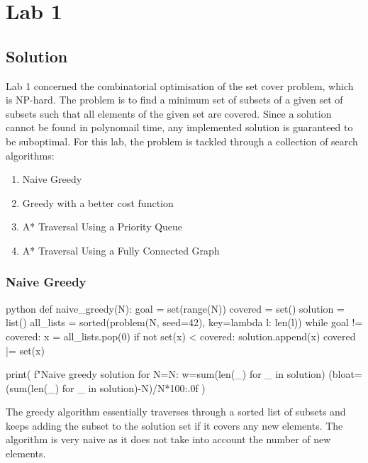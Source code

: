 
\section{Lab 1}

\subsection{Solution}

Lab 1 concerned the combinatorial optimisation of the set cover problem, which is NP-hard. The problem is to find a minimum set of subsets of a given set of subsets such that all elements of the given set are covered. Since a solution cannot be found in polynomail time, any implemented solution is guaranteed to be suboptimal. For this lab, the problem is tackled through a collection of search algorithms:

\begin{enumerate}
  \item Naive Greedy
  \item Greedy with a better cost function
  \item A* Traversal Using a Priority Queue
  \item A* Traversal Using a Fully Connected Graph
\end{enumerate}

\subsubsection{Naive Greedy}

\begin{mintedbox}{python}
  def naive_greedy(N):
    goal = set(range(N))
    covered = set()
    solution = list()
    all_lists = sorted(problem(N, seed=42), key=lambda l: len(l))
    while goal != covered:
        x = all_lists.pop(0)
        if not set(x) < covered:
            solution.append(x)
            covered |= set(x)

    print(
        f"Naive greedy solution for N={N}: w={sum(len(_) for _ in solution)} (bloat={(sum(len(_) for _ in solution)-N)/N*100:.0f}%
    )
\end{mintedbox}

The greedy algorithm essentially traverses through a sorted list of subsets and keeps adding the subset to the solution set if it covers any new elements. The algorithm is very naive as it does not take into account the number of new elements.

